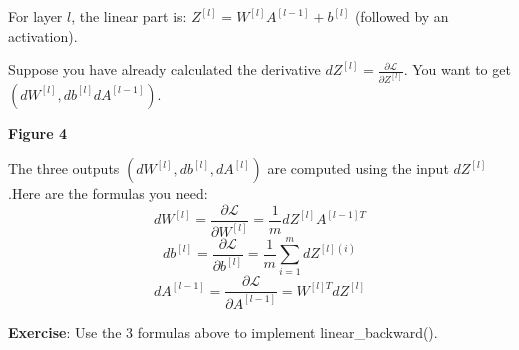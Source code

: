 \documentclass[11pt]{article}
\begin{document}
For layer \(l\), the linear part is:
\(Z^{[l]} = W^{[l]} A^{[l-1]} + b^{[l]}\) (followed by an activation).

Suppose you have already calculated the derivative
\(dZ^{[l]} = \frac{\partial \mathcal{L} }{\partial Z^{[l]}}\). You want
to get \((dW^{[l]}, db^{[l]} dA^{[l-1]})\).

\textbf{Figure 4}

The three outputs \((dW^{[l]}, db^{[l]}, dA^{[l]})\) are computed using
the input \(dZ^{[l]}\).Here are the formulas you need:
\[ dW^{[l]} = \frac{\partial \mathcal{L} }{\partial W^{[l]}} = \frac{1}{m} dZ^{[l]} A^{[l-1] T} \tag{8}\]
\[ db^{[l]} = \frac{\partial \mathcal{L} }{\partial b^{[l]}} = \frac{1}{m} \sum_{i = 1}^{m} dZ^{[l](i)}\tag{9}\]
\[ dA^{[l-1]} = \frac{\partial \mathcal{L} }{\partial A^{[l-1]}} = W^{[l] T} dZ^{[l]} \tag{10}\]

    \textbf{Exercise}: Use the 3 formulas above to implement
linear\_backward().
\end{document}

